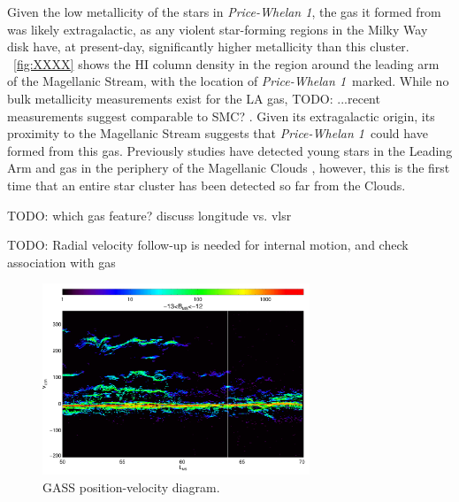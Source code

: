 \documentclass[modern]{aastex62}
\newcommand{\todo}[1]{{\color{red} TODO: #1}}
\newcommand{\vlsr}{$V_{\rm LSR}~$}
\newcommand{\hi}{H{\footnotesize I} }
\newcommand{\clustername}{\textsl{Price-Whelan 1}}
\begin{document}
Given the low metallicity of the stars in \clustername, the gas it formed from was likely extragalactic, as any violent star-forming regions in the Milky Way disk have, at present-day, significantly higher metallicity than this cluster.
\figurename~\ref{fig:XXXX} shows the \hi column density in the region around the leading arm of the Magellanic Stream, with the location of \clustername\ marked.
While no bulk metallicity measurements exist for the LA gas, \todo{...recent measurements suggest comparable to SMC?} \citep{Fox:2018}.
Given its extragalactic origin, its proximity to the Magellanic Stream suggests that \clustername\ could have formed from this gas.
Previously studies have detected young stars in the Leading Arm and gas in the periphery of the Magellanic Clouds \citep{Casetti-Dinescu:2014, MoniBidin:2017}, however, this is the first time that an entire star cluster has been detected so far from the Clouds.

\todo{which gas feature? discuss longitude vs. vlsr}


\todo{Radial velocity follow-up is needed for internal motion, and check association with gas}


\begin{figure}
\centering
\includegraphics[width=8cm]{gass_vlsrmlon.pdf}
\caption{GASS position-velocity diagram.}
\label{fig_gass}
\end{figure}
\end{document}
